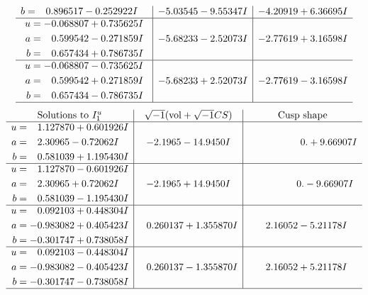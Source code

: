 \documentclass[1p]{elsarticle_modified}
\theoremstyle{definition}
\newcommand{\I}{\sqrt{-1}}
\begin{document}
$$\begin{array}{c|c|c}
\begin{aligned}
b &= \phantom{-}0.896517 - 0.252922 I\end{aligned}
 & -5.03545 - 9.55347 I & -4.20919 + 6.36695 I \\ \hline\begin{aligned}
u &= -0.068807 + 0.735625 I \\
a &= \phantom{-}0.599542 - 0.271859 I \\
b &= \phantom{-}0.657434 + 0.786735 I\end{aligned}
 & -5.68233 - 2.52073 I & -2.77619 + 3.16598 I \\ \hline\begin{aligned}
u &= -0.068807 - 0.735625 I \\
a &= \phantom{-}0.599542 + 0.271859 I \\
b &= \phantom{-}0.657434 - 0.786735 I\end{aligned}
 & -5.68233 + 2.52073 I & -2.77619 - 3.16598 I\\
 \hline 
 \end{array}$$\newpage$$\begin{array}{c|c|c}  
\text{Solutions to }I^u_{1}& \I (\text{vol} + \sqrt{-1}CS) & \text{Cusp shape}\\
 \hline 
\begin{aligned}
u &= \phantom{-}1.127870 + 0.601926 I \\
a &= \phantom{-}2.30965 - 0.72062 I \\
b &= \phantom{-}0.581039 + 1.195430 I\end{aligned}
 & -2.1965 - 14.9450 I & \phantom{-0.000000 -}0. + 9.66907 I \\ \hline\begin{aligned}
u &= \phantom{-}1.127870 - 0.601926 I \\
a &= \phantom{-}2.30965 + 0.72062 I \\
b &= \phantom{-}0.581039 - 1.195430 I\end{aligned}
 & -2.1965 + 14.9450 I & \phantom{-0.000000 } 0. - 9.66907 I \\ \hline\begin{aligned}
u &= \phantom{-}0.092103 + 0.448304 I \\
a &= -0.983082 + 0.405423 I \\
b &= -0.301747 + 0.738058 I\end{aligned}
 & \phantom{-}0.260137 + 1.355870 I & \phantom{-}2.16052 - 5.21178 I \\ \hline\begin{aligned}
u &= \phantom{-}0.092103 - 0.448304 I \\
a &= -0.983082 - 0.405423 I \\
b &= -0.301747 - 0.738058 I\end{aligned}
 & \phantom{-}0.260137 - 1.355870 I & \phantom{-}2.16052 + 5.21178 I\\
 \hline 
 \end{array}$$\newpage\newpage\renewcommand{\arraystretch}{1}
\end{document}
